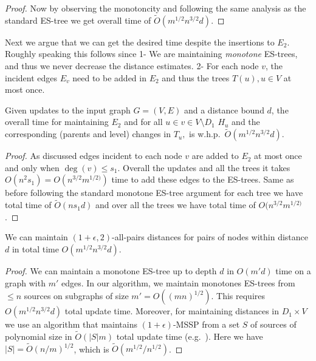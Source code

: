 {\begin{proof}
Now by observing the monotoncity and following the same analysis as the standard ES-tree we get overall time of $\tilde{O}(m^{1/2}n^{3/2}d)$. 
\end{proof}

Next we argue that we can get the desired time despite the insertions to $E_2$. Roughly speaking this follows since 1- We are maintaining \textit{monotone} ES-trees, and thus we never decrease the distance estimates. 2- For each node $v$, the incident edges $E_v$ need to be added in $E_2$ and thus the trees $T(u), u \in V$ at most once.

\begin{lemma}\label{lem:update_E2}
Given updates to the input graph $G=(V,E)$ and a distance bound $d$, the overall time for maintaining $E_2$ and for all $u \in v\in V \setminus D_1$ $H_u$ and the corresponding (parents and level) changes in $T_u,$ is w.h.p.~$\tilde{O}(m^{1/2}n^{3/2}d)$.
\end{lemma}
\begin{proof}
As discussed edges incident to each node $v$ are added to $E_2$ at most once and only when $\deg(v)\leq s_1$. Overall the updates and all the trees it takes $O(n^2 s_1)=O(n^{3/2}m^{1/2)})$ time to add these edges to the ES-trees. 
Same as before following the standard monotone ES-tree argument for each tree we have total time of $\tilde{O}(n s_1 d)$ and over all the trees we have total time of $O(n^{3/2}m^{1/2)}$.
\end{proof}

\begin{lemma}\label{lem:warm_up_time}
We can maintain $(1+\epsilon, 2)$-all-pairs distances for pairs of nodes within distance $d$ in total time $O(m^{1/2}n^{3/2}d)$.
\end{lemma}
\begin{proof}
 We can maintain a monotone ES-tree up to depth $d$ in $O(m'd)$ time on a graph with $m'$ edges. In our algorithm, we maintain monotones ES-trees from $\leq n$ sources on subgraphs of size $m'=O((mn)^{1/2})$. This requires $O(m^{1/2}n^{3/2}d)$ total update time.
Moreover, for maintaining distances in $D_1 \times V$ we use an algorithm that maintains $(1+\epsilon)$-MSSP from a set $S$ of sources of polynomial size in $\tilde{O}(|S|m)$ total update time (e.g.~\cite{LN2020}). Here we have $|S|=\tilde{O}(n/m)^{1/2}$, which is $\tilde{O}(m^{1/2}/n^{1/2})$.
\end{proof}
}
